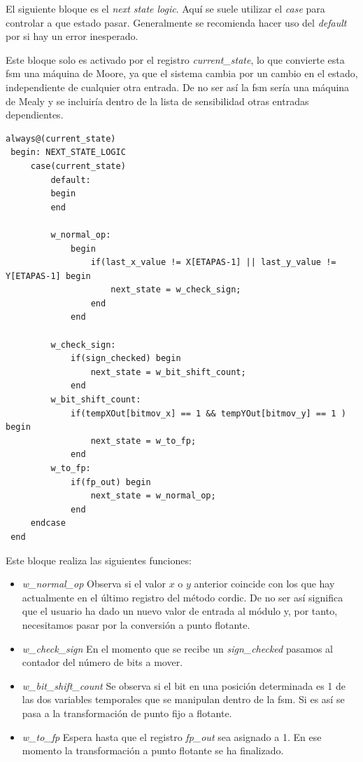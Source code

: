 El siguiente bloque es el \textit{next state logic}. Aquí se suele utilizar el \textit{case} para controlar a que estado pasar. Generalmente se recomienda hacer uso del \textit{default} por si hay un error inesperado.

Este bloque solo es activado por el registro \textit{current\_state}, lo que convierte esta \gls{fsm} una máquina de Moore, ya que el sistema cambia por un cambio en el estado, independiente de cualquier otra entrada. De no ser así la \gls{fsm} sería una máquina de Mealy y se incluiría dentro de la lista de sensibilidad otras entradas dependientes.

\begin{lstlisting}[caption={Código de la \textit{next state logic} de la \gls{fsm}}]
always@(current_state)
 begin: NEXT_STATE_LOGIC
     case(current_state)
         default:
         begin
         end
         
         w_normal_op:
             begin
                 if(last_x_value != X[ETAPAS-1] || last_y_value != Y[ETAPAS-1] begin
                     next_state = w_check_sign;
                 end
             end

         w_check_sign:
             if(sign_checked) begin
                 next_state = w_bit_shift_count;
             end
         w_bit_shift_count:
             if(tempXOut[bitmov_x] == 1 && tempYOut[bitmov_y] == 1 ) begin
                 next_state = w_to_fp;
             end
         w_to_fp:
             if(fp_out) begin
                 next_state = w_normal_op;
             end
     endcase
 end
\end{lstlisting}

Este bloque realiza las siguientes funciones:

\begin{itemize}
	\item \textit{w\_normal\_op} Observa si el valor $x$ o $y$ anterior coincide con los que hay actualmente en el último registro del método \gls{cordic}. De no ser así significa que el usuario ha dado un nuevo valor de entrada al módulo y, por tanto, necesitamos pasar por la conversión a punto flotante.
	
	\item \textit{w\_check\_sign} En el momento que se recibe un \textit{sign\_checked} pasamos al contador del número de bits a mover.
	
	\item \textit{w\_bit\_shift\_count} Se observa si el bit en una posición determinada es 1 de las dos variables temporales que se manipulan dentro de la \gls{fsm}. Si es así se pasa a la transformación de punto fijo a flotante.
	
	\item \textit{w\_to\_fp} Espera hasta que el registro \textit{fp\_out} sea asignado a 1. En ese momento la transformación a punto flotante se ha finalizado.
\end{itemize} 

